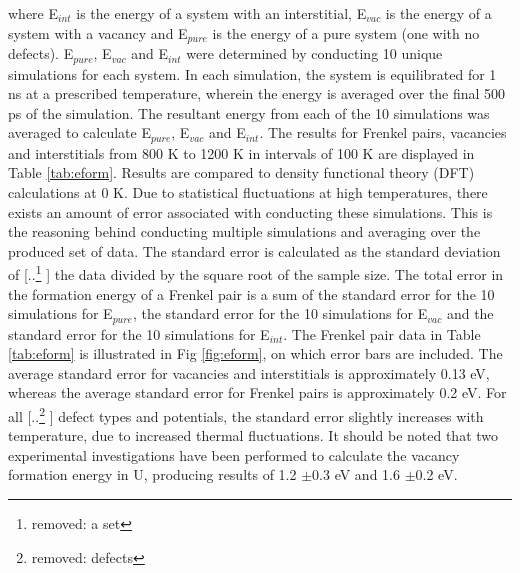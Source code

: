 \documentclass[review]{elsarticle}
\providecommand{\DIFaddtex}[1]{{\protect\color{blue} \sf #1}} %
\providecommand{\DIFdeltex}[1]{{\protect\color{red} [..\footnote{removed: #1} ]}} %
\providecommand{\DIFaddbegin}{} %
\providecommand{\DIFaddend}{} %
\providecommand{\DIFdelbegin}{} %
\providecommand{\DIFdelend}{} %
\providecommand{\DIFadd}[1]{\texorpdfstring{\DIFaddtex{#1}}{#1}} %
\providecommand{\DIFdel}[1]{\texorpdfstring{\DIFdeltex{#1}}{}} %
\newcommand{\DIFscaledelfig}{0.5}
\newlength{\DIFdelgraphicswidth} %
\newlength{\DIFdelgraphicsheight} %
\newcommand{\DIFaddincludegraphics}[2][]{{\color{blue}\fbox{\DIFOincludegraphics[#1]{#2}}}} %
\newcommand{\DIFdelincludegraphics}[2][]{%
\sbox{\DIFdelgraphicsbox}{\DIFOincludegraphics[#1]{#2}}%
\settoboxwidth{\DIFdelgraphicswidth}{\DIFdelgraphicsbox} %
\settoboxtotalheight{\DIFdelgraphicsheight}{\DIFdelgraphicsbox} %
\scalebox{\DIFscaledelfig}{%
\parbox[b]{\DIFdelgraphicswidth}{\usebox{\DIFdelgraphicsbox}\\[-\baselineskip] \rule{\DIFdelgraphicswidth}{0em}}\llap{\resizebox{\DIFdelgraphicswidth}{\DIFdelgraphicsheight}{%
\setlength{\unitlength}{\DIFdelgraphicswidth}%
\begin{picture}(1,1)%
\thicklines\linethickness{2pt} %
{\color[rgb]{1,0,0}\put(0,0){\framebox(1,1){}}}%
{\color[rgb]{1,0,0}\put(0,0){\line( 1,1){1}}}%
{\color[rgb]{1,0,0}\put(0,1){\line(1,-1){1}}}%
\end{picture}%
}\hspace*{3pt}}} %
} %
\DeclareRobustCommand{\DIFaddbegin}{\DIFOaddbegin \let\includegraphics\DIFaddincludegraphics} %
\DeclareRobustCommand{\DIFaddend}{\DIFOaddend \let\includegraphics\DIFOincludegraphics} %
\DeclareRobustCommand{\DIFdelbegin}{\DIFOdelbegin \let\includegraphics\DIFdelincludegraphics} %
\DeclareRobustCommand{\DIFdelend}{\DIFOaddend \let\includegraphics\DIFOincludegraphics} %
\begin{document}
where E$_{int}$ is the energy of a system with an interstitial, E$_{vac}$ is the energy of a system with a vacancy and E$_{pure}$ is the energy of a pure system (one with no defects). E$_{pure}$, E$_{vac}$ and E$_{int}$ were determined by conducting 10 unique simulations for each system. In each simulation, the system is equilibrated for 1 ns at a prescribed temperature, wherein the energy is averaged over the final 500 ps of the simulation. The resultant energy from each of the 10 simulations was averaged to calculate E$_{pure}$, E$_{vac}$ and E$_{int}$. The results for Frenkel pairs, vacancies and interstitials from 800 K to 1200 K in intervals of 100 K are displayed in Table \ref{tab:eform}. \DIFaddbegin \DIFadd{Results are compared to density functional theory (DFT) calculations at 0 K. }\DIFaddend Due to statistical fluctuations at high temperatures, there exists an amount of error associated with conducting these simulations. This is the reasoning behind conducting multiple simulations and averaging over the produced set of data. The standard error is calculated as the standard deviation of \DIFdelbegin \DIFdel{a set }\DIFdelend \DIFaddbegin \DIFadd{the data }\DIFaddend divided by the square root of the sample size. The total error in the formation energy of a Frenkel pair is a sum of the standard error for the 10 simulations for E$_{pure}$, the standard error for the 10 simulations for E$_{vac}$ and the standard error for the 10 simulations for E$_{int}$. The Frenkel pair data in Table \ref{tab:eform} is illustrated in Fig \ref{fig:eform}, on which error bars are included. The average standard error for vacancies and interstitials is approximately 0.13 eV, whereas the average standard error for Frenkel pairs is approximately 0.2 eV. For all \DIFdelbegin \DIFdel{defects }\DIFdelend \DIFaddbegin \DIFadd{defect types }\DIFaddend and potentials, the standard error slightly increases with temperature, due to increased thermal fluctuations. It should be noted that two experimental investigations have been performed to calculate the vacancy formation energy in U, producing results of 1.2 $\pm$0.3 \DIFaddbegin \DIFadd{eV}\DIFaddend \cite{matter1980} and 1.6 $\pm$0.2 \DIFaddbegin \DIFadd{eV}\DIFaddend \cite{lund2013}.
\end{document}
